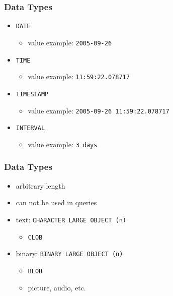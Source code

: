 \documentclass[dvipsnames]{beamer}
\theoremstyle{plain}
\begin{document}
\begin{frame}
  \frametitle{Data Types}

  \begin{itemize}
    \item \lstinline!DATE!
    \begin{itemize}
      \item value example: \texttt{2005-09-26}
    \end{itemize}

    \pause
    \medskip
    \item \lstinline!TIME!
    \begin{itemize}
      \item value example: \texttt{11:59:22.078717}
    \end{itemize}

    \pause
    \medskip
    \item \lstinline!TIMESTAMP!
    \begin{itemize}
      \item value example: \texttt{2005-09-26 11:59:22.078717}
    \end{itemize}

    \pause
    \medskip
    \item \lstinline!INTERVAL!
    \begin{itemize}
      \item value example: \texttt{3 days}
    \end{itemize}
  \end{itemize}
\end{frame}

\begin{frame}
  \frametitle{Data Types}

  \begin{itemize}
    \item arbitrary length
    \item can not be used in queries

    \pause
    \bigskip
    \item text: \lstinline!CHARACTER LARGE OBJECT (n)!
    \begin{itemize}
      \item \lstinline!CLOB!
    \end{itemize}

    \pause
    \item binary: \lstinline!BINARY LARGE OBJECT (n)!
    \begin{itemize}
      \item \lstinline!BLOB!
      \item picture, audio, etc.
    \end{itemize}
  \end{itemize}
\end{frame}
\end{document}
